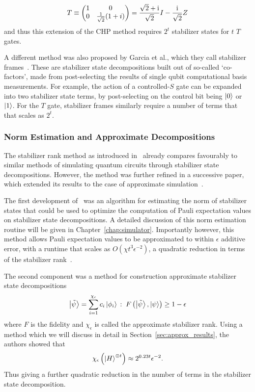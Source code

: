 \[T\equiv \begin{pmatrix}1 & 0 \\ 0 & \frac{1}{\sqrt{2}}(1+i)\end{pmatrix} = \frac{\sqrt{2}+\mathrm{i}}{\sqrt{2}}I-\frac{\mathrm{i}}{\sqrt{2}}Z \]
and thus this extension of the CHP method requires $2^{t}$ stabilizer states for $t$ $T$ gates.\par
A different method was also proposed by Garcia et al., which they call stabilizer frames~\cite{Garcia2015}. These are stabilizer state decompositions built out of so-called `co-factors', made from post-selecting the results of single qubit computational basis measurements. For example, the action of a controlled-$S$ gate can be expanded into two stabilizer state terms, by post-selecting on the control bit being $\ket{0}$ or $\ket{1}$. For the $T$ gate, stabilizer frames similarly require a number of terms that that scales as $2^{t}$.
\subsubsection*{Norm Estimation and Approximate Decompositions}
The stabilizer rank method as introduced in~\cite{Bravyi2015} already compares favourably to similar methods of simulating quantum circuits through stabilizer state decompositions. However, the method was further refined in a successive paper, which extended its results to the case of approximate simulation~\cite{Bravyi2016}.\par
The first development of~\cite{Bravyi2016} was an algorithm for estimating the norm of stabilizer states that could be used to optimize the computation of Pauli expectation values on stabilizer state decompositions. A detailed discussion of this norm estimation routine will be given in Chapter~\ref{chap:simulator}. Importantly however, this method allows Pauli expectation values to be approximated to within $\epsilon$ additive error, with a runtime that scales as $O(\chi t^{3}\epsilon^{-2})$, a quadratic reduction in terms of the stabilizer rank~\cite{Bravyi2016}.\par
The second component was a method for construction approximate stabilizer state decompositions
\begin{equation}
\ket{\tilde{\psi}}=\sum_{i=1}^{\chi_{\epsilon}}c_{i}\ket{\phi_{i}}\,:\;F\left(\ket{\tilde{\psi}},\ket{\psi}\right)\geq1-\epsilon
\label{eq:old_approx_rank}
\end{equation}
where $F$ is the fidelity and $\chi_{\epsilon}$ is called the approximate stabilizer rank. Using a method which we will discuss in detail in Section~\ref{sec:approx_results}, the authors showed that
\begin{equation}
\chi_{\epsilon}\left(\ket{H}^{\otimes t}\right)\approx 2^{0.23t}\epsilon^{-2}.
\label{eq:approx_t_rank}
\end{equation}
Thus giving a further quadratic reduction in the number of terms in the stabilizer state decomposition.\par
